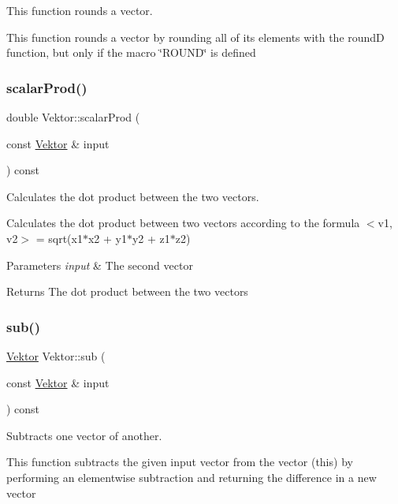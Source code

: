 This function rounds a vector. 

This function rounds a vector by rounding all of its elements with the roundD function, but only if the macro \char`\"{}\+R\+O\+U\+N\+D\char`\"{} is defined \mbox{\label{class_vektor_ad517a8ae863c578a6d46c924ff3db1d5}} 
\subsubsection{\texorpdfstring{scalar\+Prod()}{scalarProd()}}
{\footnotesize\ttfamily double Vektor\+::scalar\+Prod (\begin{DoxyParamCaption}\item[{const \hyperlink{class_vektor}{Vektor} \&}]{input }\end{DoxyParamCaption}) const}



Calculates the dot product between the two vectors. 

Calculates the dot product between two vectors according to the formula $<$v1, v2$>$ = sqrt(x1$\ast$x2 + y1$\ast$y2 + z1$\ast$z2)


\begin{DoxyParams}{Parameters}
{\em input} & The second vector\\
\hline
\end{DoxyParams}
\begin{DoxyReturn}{Returns}
The dot product between the two vectors 
\end{DoxyReturn}
\mbox{\label{class_vektor_a9e095d5d627ad26c7c2d6f227567e731}} 
\subsubsection{\texorpdfstring{sub()}{sub()}}
{\footnotesize\ttfamily \hyperlink{class_vektor}{Vektor} Vektor\+::sub (\begin{DoxyParamCaption}\item[{const \hyperlink{class_vektor}{Vektor} \&}]{input }\end{DoxyParamCaption}) const}



Subtracts one vector of another. 

This function subtracts the given input vector from the vector (this) by performing an elementwise subtraction and returning the difference in a new vector


